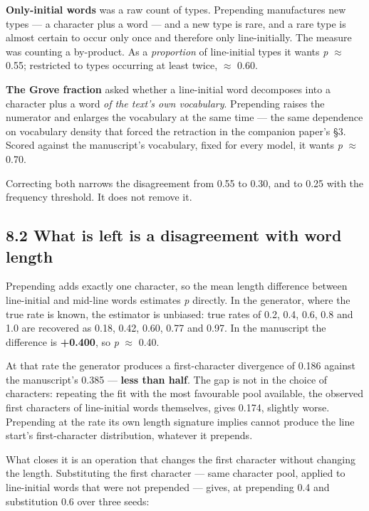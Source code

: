 \documentclass[11pt,a4paper]{article}
\begin{document}
\textbf{Only-initial words} was a raw count of types. Prepending manufactures new types --- a character plus a word --- and a new type is rare, and a rare type is almost certain to occur only once and therefore only line-initially. The measure was counting a by-product. As a \emph{proportion} of line-initial types it wants \emph{p} $\approx$ 0.55; restricted to types occurring at least twice, $\approx$ 0.60.


\textbf{The Grove fraction} asked whether a line-initial word decomposes into a character plus a word \emph{of the text's own vocabulary}. Prepending raises the numerator and enlarges the vocabulary at the same time --- the same dependence on vocabulary density that forced the retraction in the companion paper's \S3. Scored against the manuscript's vocabulary, fixed for every model, it wants \emph{p} $\approx$ 0.70.


Correcting both narrows the disagreement from 0.55 to 0.30, and to 0.25 with the frequency threshold. It does not remove it.


\subsection*{8.2 What is left is a disagreement with word length}


Prepending adds exactly one character, so the mean length difference between line-initial and mid-line words estimates \emph{p} directly. In the generator, where the true rate is known, the estimator is unbiased: true rates of 0.2, 0.4, 0.6, 0.8 and 1.0 are recovered as 0.18, 0.42, 0.60, 0.77 and 0.97. In the manuscript the difference is \textbf{+0.400}, so \emph{p} $\approx$ 0.40.


At that rate the generator produces a first-character divergence of 0.186 against the manuscript's 0.385 --- \textbf{less than half}. The gap is not in the choice of characters: repeating the fit with the most favourable pool available, the observed first characters of line-initial words themselves, gives 0.174, slightly worse. Prepending at the rate its own length signature implies cannot produce the line start's first-character distribution, whatever it prepends.


What closes it is an operation that changes the first character without changing the length. Substituting the first character --- same character pool, applied to line-initial words that were not prepended --- gives, at prepending 0.4 and substitution 0.6 over three seeds:
\end{document}
